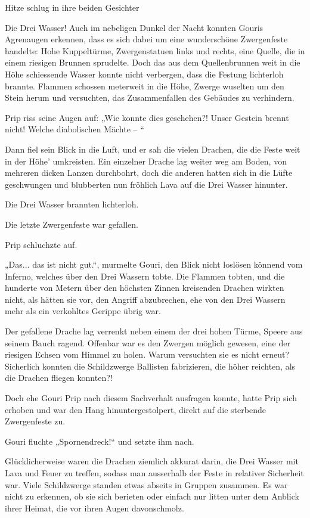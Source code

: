 \documentclass[10pt, a4paper, oneside]{book}
\begin{document}
Hitze schlug in ihre beiden Gesichter

Die Drei Wasser! Auch im nebeligen Dunkel der Nacht konnten Gouris Agrenaugen erkennen, dass es sich dabei um eine wunderschöne Zwergenfeste handelte: Hohe Kuppeltürme, Zwergenstatuen links und rechts, eine Quelle, die in einem riesigen Brunnen sprudelte. Doch das aus dem Quellenbrunnen weit in die Höhe schiessende Wasser konnte nicht verbergen, dass die Festung lichterloh brannte. Flammen schossen meterweit in die Höhe, Zwerge wuselten um den Stein herum und versuchten, das Zusammenfallen des Gebäudes zu verhindern.

Prip riss seine Augen auf: „Wie konnte dies geschehen?! Unser Gestein brennt nicht! Welche diabolischen Mächte – “

Dann fiel sein Blick in die Luft, und er sah die vielen Drachen, die die Feste weit in der Höhe’ umkreisten. Ein einzelner Drache lag weiter weg am Boden, von mehreren dicken Lanzen durchbohrt, doch die anderen hatten sich in die Lüfte geschwungen und blubberten nun fröhlich Lava auf die Drei Wasser hinunter.

Die Drei Wasser brannten lichterloh.

Die letzte Zwergenfeste war gefallen.

Prip schluchzte auf.

„Das... das ist nicht gut.“, murmelte Gouri, den Blick nicht loslösen könnend vom Inferno, welches über den Drei Wassern tobte. Die Flammen tobten, und die hunderte von Metern über den höchsten Zinnen kreisenden Drachen wirkten nicht, als hätten sie vor, den Angriff abzubrechen, ehe von den Drei Wassern mehr als ein verkohltes Gerippe übrig war.

Der gefallene Drache lag verrenkt neben einem der drei hohen Türme, Speere aus seinem Bauch ragend. Offenbar war es den Zwergen möglich gewesen, eine der riesigen Echsen vom Himmel zu holen. Warum versuchten sie es nicht erneut? Sicherlich konnten die Schildzwerge Ballisten fabrizieren, die höher reichten, als die Drachen fliegen konnten?!

Doch ehe Gouri Prip nach diesem Sachverhalt ausfragen konnte, hatte Prip sich erhoben und war den Hang hinuntergestolpert, direkt auf die sterbende Zwergenfeste zu.

Gouri fluchte „Spornendreck!“ und setzte ihm nach.

Glücklicherweise waren die Drachen ziemlich akkurat darin, die Drei Wasser mit Lava und Feuer zu treffen, sodass man ausserhalb der Feste in relativer Sicherheit war. Viele Schildzwerge standen etwas abseits in Gruppen zusammen. Es war nicht zu erkennen, ob sie sich berieten oder einfach nur litten unter dem Anblick ihrer Heimat, die vor ihren Augen davonschmolz.
\end{document}
